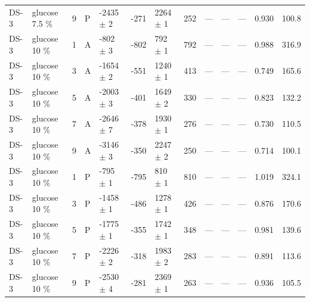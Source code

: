 \documentclass[11pt,a4paper]{article}
\begin{document}
\begin{landscape}
{\begin{longtable}{@{}lllllllllllll@{}}
DS-3 & glucose 7.5 \% & 9 & P & -2435 $\pm$ 2 & -271 & 2264 $\pm$ 1 & 252 & --- & --- & --- & 0.930 & 100.8 \\
DS-3 & glucose 10 \% & 1 & A & -802 $\pm$ 3 & -802 & 792 $\pm$ 1 & 792 & --- & --- & --- & 0.988 & 316.9 \\
DS-3 & glucose 10 \% & 3 & A & -1654 $\pm$ 2 & -551 & 1240 $\pm$ 1 & 413 & --- & --- & --- & 0.749 & 165.6 \\
DS-3 & glucose 10 \% & 5 & A & -2003 $\pm$ 3 & -401 & 1649 $\pm$ 2 & 330 & --- & --- & --- & 0.823 & 132.2 \\
DS-3 & glucose 10 \% & 7 & A & -2646 $\pm$ 7 & -378 & 1930 $\pm$ 1 & 276 & --- & --- & --- & 0.730 & 110.5 \\
DS-3 & glucose 10 \% & 9 & A & -3146 $\pm$ 3 & -350 & 2247 $\pm$ 2 & 250 & --- & --- & --- & 0.714 & 100.1 \\
DS-3 & glucose 10 \% & 1 & P & -795 $\pm$ 1 & -795 & 810 $\pm$ 1 & 810 & --- & --- & --- & 1.019 & 324.1 \\
DS-3 & glucose 10 \% & 3 & P & -1458 $\pm$ 1 & -486 & 1278 $\pm$ 1 & 426 & --- & --- & --- & 0.876 & 170.6 \\
DS-3 & glucose 10 \% & 5 & P & -1775 $\pm$ 1 & -355 & 1742 $\pm$ 1 & 348 & --- & --- & --- & 0.981 & 139.6 \\
DS-3 & glucose 10 \% & 7 & P & -2226 $\pm$ 2 & -318 & 1983 $\pm$ 2 & 283 & --- & --- & --- & 0.891 & 113.6 \\
DS-3 & glucose 10 \% & 9 & P & -2530 $\pm$ 4 & -281 & 2369 $\pm$ 1 & 263 & --- & --- & --- & 0.936 & 105.5 \\
\bottomrule
\end{longtable}}\end{landscape}
\end{document}

